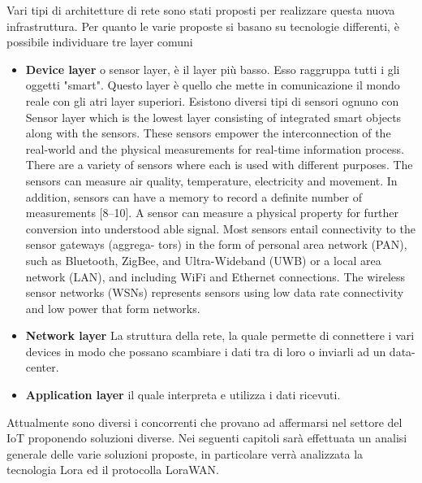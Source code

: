 Vari tipi di architetture di rete sono stati proposti per realizzare questa
nuova infrastruttura. Per quanto le varie proposte si basano su tecnologie
differenti, è possibile individuare tre layer comuni 
\begin{itemize}
\item \textbf{Device layer} o sensor layer, è il layer più basso. Esso raggruppa
tutti i gli oggetti "smart". Questo layer è quello che mette in comunicazione il
mondo reale con gli atri layer superiori. Esistono diversi tipi di sensori
ognuno con Sensor layer which is the lowest layer consisting of integrated smart objects along
with the sensors. These sensors empower the interconnection of the real-world and
the physical measurements for real-time information process. There are a variety
of sensors where each is used with different purposes. The sensors can measure air
quality, temperature, electricity and movement. In addition, sensors can have a
memory to record a definite number of measurements [8–10].
A sensor can measure a physical property for further conversion into understood
able signal. Most sensors entail connectivity to the sensor gateways (aggrega-
tors) in the form of personal area network (PAN), such as Bluetooth, ZigBee,
and Ultra-Wideband (UWB) or a local area network (LAN), and including WiFi
and Ethernet connections. The wireless sensor networks (WSNs) represents
sensors using low data rate connectivity and low power that form networks.
\item \textbf{Network layer} La struttura della rete, la quale permette di
connettere i vari devices in modo che possano scambiare i dati tra di loro o
inviarli ad un data-center.
\item \textbf{Application layer} il quale interpreta e utilizza i dati ricevuti.
\end{itemize}

Attualmente sono diversi i concorrenti che provano ad affermarsi nel settore
del IoT proponendo soluzioni diverse. Nei seguenti capitoli sarà
effettuata un analisi generale delle varie soluzioni proposte, 
in particolare verrà analizzata la tecnologia Lora ed il protocolla LoraWAN.

